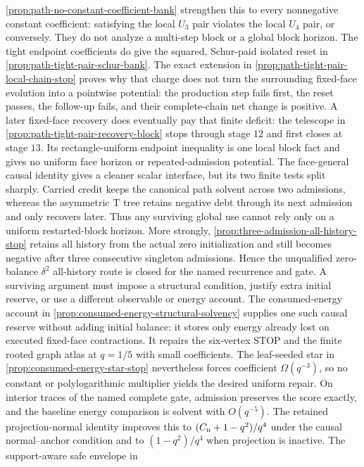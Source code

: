 \begin{enumerate}[leftmargin=2em]
\cref{prop:path-no-constant-coefficient-bank} strengthen this to every
nonnegative constant coefficient: satisfying the local $U_3$ pair violates
the local $U_4$ pair, or conversely.  They do not analyze a multi-step block
or a global block horizon.  The tight endpoint coefficients do give the
squared, Schur-paid isolated reset in
\cref{prop:path-tight-pair-schur-bank}.  The exact extension in
\cref{prop:path-tight-pair-local-chain-stop} proves why that charge does not
turn the surrounding fixed-face evolution into a pointwise potential: the
production step fails first, the reset passes, the follow-up fails, and their
complete-chain net change is positive.  A later fixed-face recovery does
eventually pay that finite deficit: the telescope in
\cref{prop:path-tight-pair-recovery-block} stops through stage $12$ and first
closes at stage $13$.  Its rectangle-uniform endpoint inequality is one
local block fact and gives no uniform face horizon or repeated-admission
potential.
The face-general causal identity gives a cleaner scalar interface, but its two
finite tests split sharply.  Carried credit keeps the canonical path solvent
across two admissions, whereas the asymmetric T tree retains negative debt
through its next admission and only recovers later.  Thus any surviving
global use cannot rely only on a uniform restarted-block horizon.  More
strongly, \cref{prop:three-admission-all-history-stop} retains all history
from the actual zero initialization and still becomes negative after three
consecutive singleton admissions.  Hence the unqualified zero-balance
$\delta^2$ all-history route is closed for the named recurrence and gate.  A
surviving argument must impose a structural condition, justify extra initial
reserve, or use a different observable or energy account.
The consumed-energy account in
\cref{prop:consumed-energy-structural-solvency} supplies one such causal
reserve without adding initial balance: it stores only energy already lost on
executed fixed-face contractions.  It repairs the six-vertex STOP and the
finite rooted graph atlas at $q=1/5$ with small coefficients.  The leaf-seeded
star in \cref{prop:consumed-energy-star-stop} nevertheless forces coefficient
$\Omega(q^{-3})$, so no constant or polylogarithmic multiplier yields the
desired uniform repair.  On interior traces of the named complete gate,
admission preserves the score exactly, and the baseline energy comparison is
solvent with $O(q^{-5})$.  The retained projection-normal identity improves
this to $(C_{\rm n}+1-q^2)/q^4$ under the causal normal--anchor condition and
to $(1-q^2)/q^4$ when projection is inactive.  The support-aware safe envelope in

\end{enumerate}
